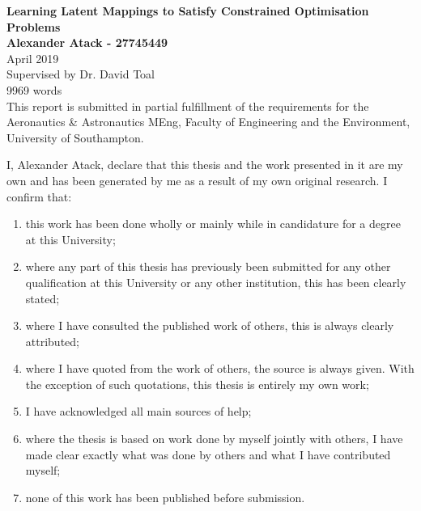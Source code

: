 \documentclass[11pt,landscape]{report}
\begin{document}
\begin{multicols*}{3}

\begin{titlepage}
    \begin{center}
        \vspace*{1cm}
        \Huge\textbf{Learning Latent Mappings to Satisfy Constrained Optimisation Problems}
        \vspace{1.5cm}
        \\\Large\textbf{Alexander Atack - 27745449}
        \\\Large{April 2019}
        \vspace{1.5cm}
        \\\Large{Supervised by Dr. David Toal}
        \\\Large{9969 words}
        \vspace{1.5cm}
        \\\small{This report is submitted in partial fulfillment of the requirements for the Aeronautics \& Astronautics MEng, Faculty of Engineering and the Environment, University of Southampton.}
        \vspace{1.5cm}
    \end{center}
    \small{
        I, Alexander Atack, declare that this thesis and the work presented in it are my own and has been generated by me as a result of my own original research.
        I confirm that:
        \begin{enumerate}
            \item this work has been done wholly or mainly while in candidature for a degree at this University;
            \item where any part of this thesis has previously been submitted for any other qualification at this University or any other institution, this has been clearly stated;
            \item where I have consulted the published work of others, this is always clearly attributed;
            \item where I have quoted from the work of others, the source is always given. With the exception of such quotations, this thesis is entirely my own work;
            \item I have acknowledged all main sources of help;
            \item where the thesis is based on work done by myself jointly with others, I have made clear exactly what was done by others and what I have contributed myself;
            \item none of this work has been published before submission.
        \end{enumerate}
    }
\end{titlepage}


\end{multicols*}
\end{document}

